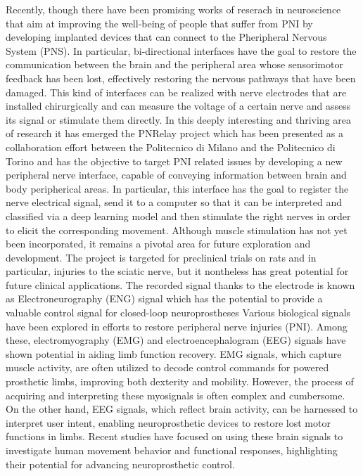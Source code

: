 \documentclass{Configuration_Files/PoliMi3i_thesis}
\begin{document}
Recently, though there have been promising works of reserach in neuroscience that aim at improving the well-being of people that suffer from PNI by developing implanted devices that can connect to the Pheripheral Nervous System (PNS).
In particular, bi-directional interfaces have the goal to restore the communication between the brain and the peripheral area whose sensorimotor feedback has been lost, effectively restoring the nervous pathways that have been damaged.
This kind of interfaces can be realized with nerve electrodes that are installed chirurgically and can measure the voltage of a certain nerve and assess its signal or stimulate them directly.
In this deeply interesting and thriving area of research it has emerged the PNRelay project 
which has been presented as a collaboration effort between the Politecnico di Milano and the Politecnico di Torino and has the objective to target PNI related issues by developing a new peripheral nerve interface, capable of conveying information between brain and body peripherical areas.
In particular, this interface has the goal to register the nerve electrical signal, send it to a computer so that it can be interpreted and classified via a deep learning model and then stimulate the right nerves in order to elicit the corresponding movement.
Although muscle stimulation has not yet been incorporated, it remains a pivotal area for future exploration and development.
The project is targeted for preclinical trials on rats and in particular, injuries to the sciatic nerve, but it nontheless has great potential for future clinical applications.
The recorded signal thanks to the electrode is known as  Electroneurography (ENG) signal
which has the potential to provide a valuable control signal for closed-loop neuroprostheses \cite{tesiDavide5} \cite{tesiDavide}
Various biological signals have been explored in efforts to restore peripheral nerve injuries (PNI). Among these, electromyography (EMG) and electroencephalogram (EEG) signals have shown potential in aiding limb function recovery. EMG signals, which capture muscle activity, are often utilized to decode control commands for powered prosthetic limbs, improving both dexterity and mobility. However, the process of acquiring and interpreting these myosignals is often complex and cumbersome. On the other hand, EEG signals, which reflect brain activity, can be harnessed to interpret user intent, enabling neuroprosthetic devices to restore lost motor functions in limbs. Recent studies have focused on using these brain signals to investigate human movement behavior and functional responses, highlighting their potential for advancing neuroprosthetic control. \cite{tesiDavide12} \cite{tesiDavide}
\end{document}
